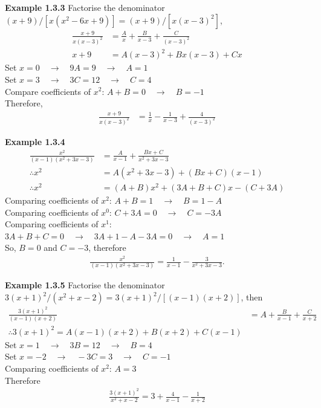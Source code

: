 \vspace{10mm}
\textbf{Example 1.3.3}
Factorise the denominator $(x+9)/[x(x^2-6x+9)] = (x+9)/[x(x-3)^2]$,
\begin{align*}
\frac{x+9}{x(x-3)^2} &= \frac{A}{x} + \frac{B}{x-3} + \frac{C}{(x-3)^2}\\
x+9 &= A(x-3)^2 + Bx(x-3) + Cx
\end{align*}
Set $x=0 \quad \rightarrow \quad 9A=9 \quad \rightarrow \quad A=1$\\
Set $x=3 \quad \rightarrow \quad 3C=12 \quad \rightarrow \quad C=4$\\
Compare coefficients of $x^2$: $A+B=0 \quad \rightarrow \quad B=-1$\\
Therefore,
\begin{align*}
\frac{x+9}{x(x-3)^2} &= \frac{1}{x} - \frac{1}{x-3} + \frac{4}{(x-3)^2}
\end{align*}

\vspace{10mm}
\textbf{Example 1.3.4}
\begin{align*}
    \frac{x^2}{(x-1)(x^2+3x-3)} &= \frac{A}{x-1} + \frac{Bx+C}{x^2+3x-3}\\
    \therefore x^2 &= A(x^2+3x-3) + (Bx+C)(x-1)\\
    \therefore x^2 &= (A+B)x^2 + (3A+B+C)x - (C+3A)
\end{align*}
Comparing coefficients of $x^2$: $A+B=1 \quad \rightarrow \quad B=1-A$\\
Comparing coefficients of $x^0$: $C+3A=0 \quad \rightarrow \quad C=-3A$\\
Comparing coefficients of $x^1$: $3A+B+C=0 \quad \rightarrow \quad 3A+1-A-3A=0 \quad \rightarrow \quad A=1$\\ 
So, $B = 0$ and $C=-3$, therefore
\begin{align*}
    \frac{x^2}{(x-1)(x^2+3x-3)} = \frac{1}{x-1} - \frac{3}{x^2+3x-3}.
\end{align*}

\vspace{10mm}
\textbf{Example 1.3.5}
Factorise the denominator $3(x+1)^2/(x^2+x-2) = 3(x+1)^2/[(x - 1)(x + 2)]$, then
\begin{align*}
    \frac{3(x+1)^2}{(x - 1)(x + 2)} &= A + \frac{B}{x-1} + \frac{C}{x+2}\\
    \therefore 3(x+1)^2 = A(x-1)(x+2) + B(x+2) + C(x-1)
\end{align*}
Set $x=1 \quad \rightarrow \quad 3B=12 \quad \rightarrow \quad B=4$\\
Set $x=-2 \quad \rightarrow \quad -3C=3 \quad \rightarrow \quad C=-1$\\
Comparing coefficients of $x^2$: $A=3$\\
Therefore
\begin{align*}
    \frac{3(x+1)^2}{x^2+x-2} = 3 + \frac{4}{x-1} - \frac{1}{x+2}
\end{align*}

